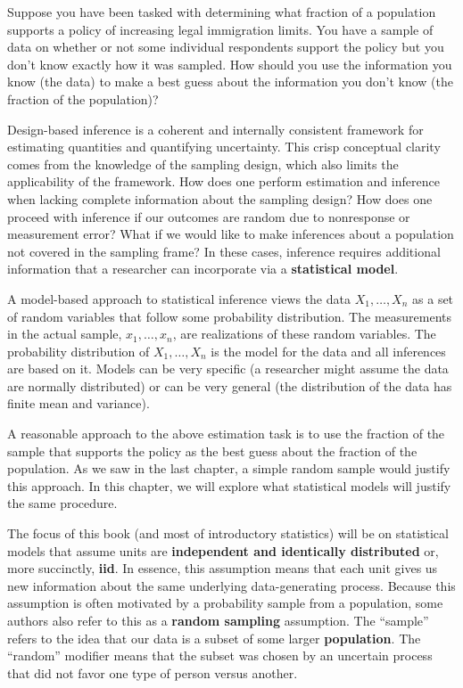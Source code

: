 \documentclass[
  letterpaper,
  DIV=11,
  numbers=noendperiod]{scrreprt}
\theoremstyle{definition}
\theoremstyle{definition}
\theoremstyle{plain}
\theoremstyle{remark}
\begin{document}
Suppose you have been tasked with determining what fraction of a
population supports a policy of increasing legal immigration limits. You
have a sample of data on whether or not some individual respondents
support the policy but you don't know exactly how it was sampled. How
should you use the information you know (the data) to make a best guess
about the information you don't know (the fraction of the population)?

Design-based inference is a coherent and internally consistent framework
for estimating quantities and quantifying uncertainty. This crisp
conceptual clarity comes from the knowledge of the sampling design,
which also limits the applicability of the framework. How does one
perform estimation and inference when lacking complete information about
the sampling design? How does one proceed with inference if our outcomes
are random due to nonresponse or measurement error? What if we would
like to make inferences about a population not covered in the sampling
frame? In these cases, inference requires additional information that a
researcher can incorporate via a \textbf{statistical model}.

A model-based approach to statistical inference views the data
\(X_1,\ldots, X_n\) as a set of random variables that follow some
probability distribution. The measurements in the actual sample,
\(x_1, \ldots, x_n\), are realizations of these random variables. The
probability distribution of \(X_1,\ldots, X_n\) is the model for the
data and all inferences are based on it. Models can be very specific (a
researcher might assume the data are normally distributed) or can be
very general (the distribution of the data has finite mean and
variance).

A reasonable approach to the above estimation task is to use the
fraction of the sample that supports the policy as the best guess about
the fraction of the population. As we saw in the last chapter, a simple
random sample would justify this approach. In this chapter, we will
explore what statistical models will justify the same procedure.

The focus of this book (and most of introductory statistics) will be on
statistical models that assume units are \textbf{independent and
identically distributed} or, more succinctly, \textbf{iid}. In essence,
this assumption means that each unit gives us new information about the
same underlying data-generating process. Because this assumption is
often motivated by a probability sample from a population, some authors
also refer to this as a \textbf{random sampling} assumption. The
``sample'' refers to the idea that our data is a subset of some larger
\textbf{population}. The ``random'' modifier means that the subset was
chosen by an uncertain process that did not favor one type of person
versus another.
\end{document}
